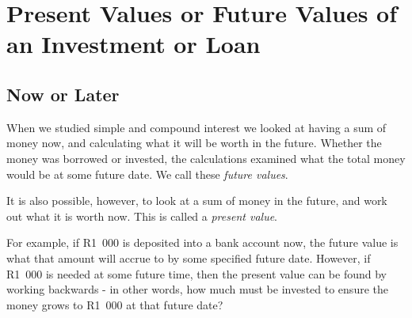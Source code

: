 
\section{Present Values or Future Values of an Investment or Loan}
\label{sec:m:f11:presentfuture}

\subsection{Now or Later}
When we studied simple and compound interest we looked at having a sum of money now, and calculating what it will be worth in the future. Whether the money was borrowed or invested, the calculations examined what the total money would be at some future date. We call these \textit{future values}.

It is also possible, however, to look at a sum of money in the future, and work out what it is worth now. This is called a \textit{present value}.

For example, if R1~000 is deposited into a bank account now, the future value is what that amount will accrue to by some specified future date. However, if R1~000 is needed at some future time, then the present value can be found by working backwards - in other words, how much must be invested to ensure the money grows to R1~000 at that future date?

